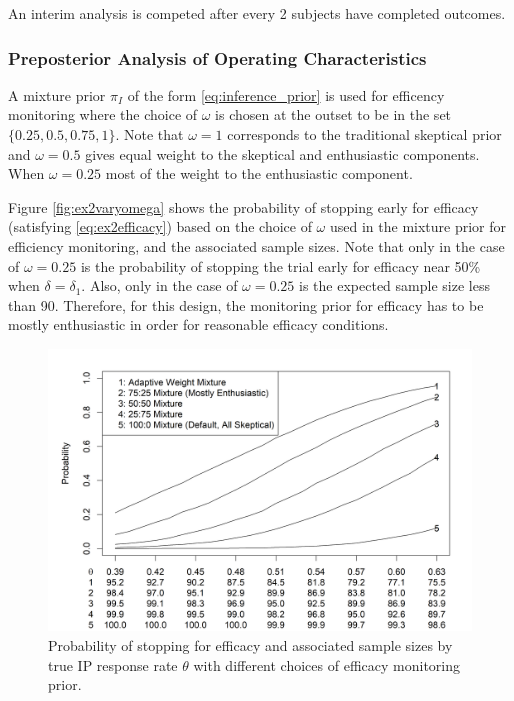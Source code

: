 \documentclass[12pt]{article}
\begin{document}
An interim analysis is competed after every 2 subjects have completed outcomes.

\subsubsection{Preposterior Analysis of Operating Characteristics}\label{sec:ex2operatingcharacteristics}
A mixture prior $\pi_I$ of the form \eqref{eq:inference_prior} is used for efficency monitoring where the choice of $\omega$ is chosen at the outset to be in the set $\{0.25,0.5,0.75,1\}$. Note that $\omega=1$ corresponds to the traditional skeptical prior and $\omega=0.5$ gives equal weight to the skeptical and enthusiastic components. When $\omega=0.25$ most of the weight to the enthusiastic component.

Figure \ref{fig:ex2varyomega} shows the probability of stopping early for efficacy (satisfying \eqref{eq:ex2efficacy}) based on the choice of $\omega$ used in the mixture prior for efficiency monitoring, and the associated sample sizes. Note that only in the case of $\omega=0.25$ is the probability of stopping the trial early for efficacy near 50\% when $\delta=\delta_1$. Also, only in the case of $\omega=0.25$ is the expected sample size less than 90. Therefore, for this design, the monitoring prior for efficacy has to be mostly enthusiastic in order for reasonable efficacy conditions.

\newpage
\begin{figure}\begin{center}
    \centering\includegraphics[width=7in]{./FIGURES/figure6.png}
    \caption{Probability of stopping for efficacy and associated sample sizes by true IP response rate $\theta$ with different choices of efficacy monitoring prior.}
\label{fig:varyomega}
 \end{center}\end{figure}
\newpage
\end{document}
